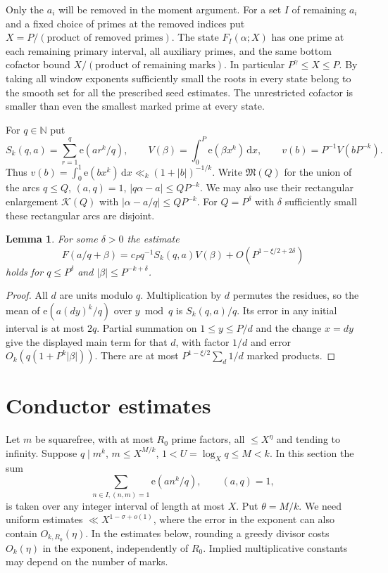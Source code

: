 \documentclass[11pt,letterpaper]{article}
\newtheorem{lemma}[lemma]{Lemma}
\theoremstyle{definition}
\newcommand{\M}{\mathfrak M}
\newcommand{\e}{\mathrm e}
\newcommand{\dd}{\,\mathrm d}
\begin{document}
Only the $a_i$ will be removed in the moment argument. For a set $I$ of
remaining $a_i$ and a fixed choice of primes at the removed indices put
$X=P/(\text{product of removed primes})$. The state $F_I(\alpha;X)$
has one prime at each remaining primary interval, all auxiliary primes,
and the same bottom cofactor bound $X/(\text{product of remaining marks})$.
In particular $P^\gamma\le X\le P$. By taking all window exponents
sufficiently small the roots in every state belong to the smooth set for
all the prescribed seed estimates. The unrestricted cofactor is smaller
than even the smallest marked prime at every state.

For $q\in\mathbb N$ put
\[
 S_k(q,a)=\sum_{r=1}^q\e(ar^k/q),\qquad
 V(\beta)=\int_0^P\e(\beta x^k)\dd x,\qquad
 v(b)=P^{-1}V(bP^{-k}).
\]
Thus $v(b)=\int_0^1\e(bx^k)\dd x\ll_k(1+|b|)^{-1/k}$.
Write $\M(Q)$ for the union of the arcs $q\le Q$,
$(a,q)=1$, $|q\alpha-a|\le QP^{-k}$. We may also use their rectangular
enlargement $\mathcal K(Q)$ with $|\alpha-a/q|\le QP^{-k}$.
For $Q=P^\delta$ with $\delta$ sufficiently small these rectangular
arcs are disjoint.
\begin{lemma}\label{lem:core}
For some $\delta>0$ the estimate
\[
 F(a/q+\beta)=c_P q^{-1}S_k(q,a)V(\beta)+O(P^{1-\xi/2+2\delta})
\]
holds for $q\le P^\delta$ and $|\beta|\le P^{-k+\delta}$.
\end{lemma}
\begin{proof}
All $d$ are units modulo $q$. Multiplication by $d$ permutes the
residues, so the mean of $\e(a(dy)^k/q)$ over $y\bmod q$ is
$S_k(q,a)/q$. Its error in any initial interval is at most $2q$.
Partial summation on $1\le y\le P/d$ and the change $x=dy$ give the
displayed main term for that $d$, with factor $1/d$ and error
$O_k(q(1+P^k|\beta|))$. There are at most
$P^{1-\xi/2}\sum_d1/d$ marked products.
\end{proof}

\section{Conductor estimates}\label{sec:conductor}
Let $m$ be squarefree, with at most $R_0$ prime factors, all
$\le X^\eta$ and tending to infinity. Suppose $q\mid m^k$,
$m\le X^{M/k}$, $1<U=\log_Xq\le M<k$. In this section the sum
\begin{equation}\label{eq:gram-entry}
 \sum_{n\in I,(n,m)=1}\e(an^k/q),\qquad (a,q)=1,
\end{equation}
is taken over any integer interval of length at most $X$. Put
$\theta=M/k$. We need uniform estimates $\ll X^{1-\sigma+o(1)}$,
where the error in the exponent can also contain $O_{k,R_0}(\eta)$.
In the estimates below, rounding a greedy divisor costs $O_k(\eta)$
in the exponent, independently of $R_0$. Implied multiplicative
constants may depend on the number of marks.
\end{document}
